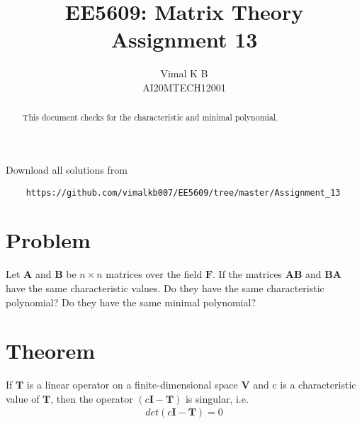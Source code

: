 \documentclass[journal,12pt,twocolumn]{IEEEtran}
\begin{document}
	\makeatletter
	\makeatother
	\let\StandardTheFigure\thefigure
	\let\vec\mathbf
	\renewcommand{\thefigure}{\theproblem}
	\def\putbox#1#2#3{\makebox[0in][l]{\makebox[#1][l]{}\raisebox{\baselineskip}[0in][0in]{\raisebox{#2}[0in][0in]{#3}}}}
	\def\rightbox#1{\makebox[0in][r]{#1}}
	\def\centbox#1{\makebox[0in]{#1}}
	\def\topbox#1{\raisebox{-\baselineskip}[0in][0in]{#1}}
	\def\midbox#1{\raisebox{-0.5\baselineskip}[0in][0in]{#1}}
	\vspace{3cm}
	\title{EE5609: Matrix Theory\\
		Assignment 13\\}
	\author{Vimal K B\\
		AI20MTECH12001}
	\maketitle
	\newpage
	\bigskip
	\renewcommand{\thefigure}{\theenumi}
	\renewcommand{\thetable}{\theenumi}
	\begin{abstract}
		This document checks for the characteristic and minimal polynomial.
	\end{abstract}
	Download all solutions from 
	\begin{lstlisting}
	https://github.com/vimalkb007/EE5609/tree/master/Assignment_13
	\end{lstlisting}
	\section{Problem}
	Let $\vec{A}$ and $\vec{B}$ be $n\times n$ matrices over the field $\mathbf{F}$. If the matrices $\vec{AB}$ and $\vec{BA}$ have the same characteristic values. Do they have the same characteristic polynomial? Do they have the same minimal polynomial? 
 	
	
	\section{Theorem}
	
	\begin{theorem}\label{thm1}
	    If $\mathbf{T}$ is a linear operator on a finite-dimensional space $\vec{V}$ and c is a characteristic value of $\mathbf{T}$, then the operator $(c\vec{I}-\mathbf{T})$ is singular, i.e.
	    \begin{align}
	    	det\left(c\vec{I}-\mathbf{T}\right) = 0 \nonumber
	    \end{align} 
	\end{theorem}
\end{document}
